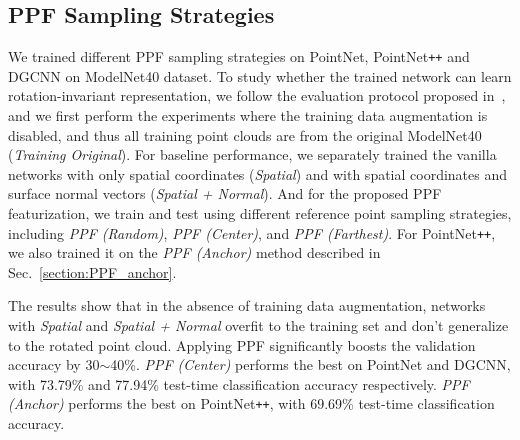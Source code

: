 \documentclass{article}
\begin{document}
\subsection{PPF Sampling Strategies}

We trained different PPF sampling strategies on PointNet, PointNet\texttt{++} and DGCNN on ModelNet40 dataset. 
To study whether the trained network can learn rotation-invariant representation, we follow the evaluation protocol proposed in~\cite{taghanaki2020robustpointset}, and we first perform the experiments where the training data augmentation is disabled, and thus all training point clouds are from the original ModelNet40 (\textit{Training Original}). 
For baseline performance, we separately trained the vanilla networks with only spatial coordinates (\textit{Spatial}) and with spatial coordinates and surface normal vectors (\textit{Spatial + Normal}).
And for the proposed PPF featurization, we train and test using different reference point sampling strategies, including \textit{PPF (Random)}, \textit{PPF (Center)}, and \textit{PPF (Farthest)}. 
For PointNet\texttt{++}, we also trained it on the \textit{PPF (Anchor)} method described in Sec.~\ref{section:PPF_anchor}. 

The results show that in the absence of training data augmentation, networks with \textit{Spatial} and \textit{Spatial + Normal} overfit to the training set and don’t generalize to the rotated point cloud. 
Applying PPF significantly boosts the validation accuracy by 30$\sim$40\%. \textit{PPF (Center)} performs the best on PointNet and DGCNN, with 73.79\% and 77.94\% test-time classification accuracy respectively. \textit{PPF (Anchor)} performs the best on PointNet\texttt{++}, with 69.69\% test-time classification accuracy.
\end{document}
